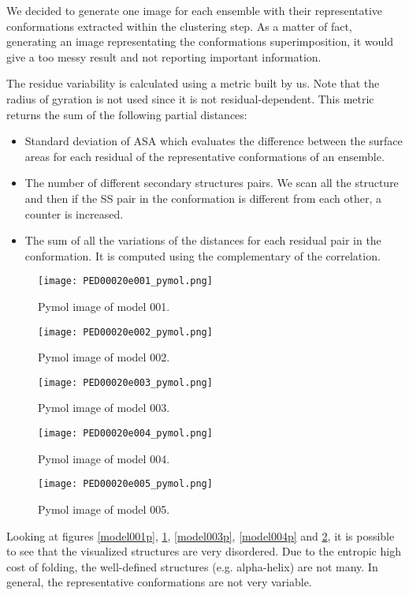 We decided to generate one image for each ensemble with their representative conformations extracted within the clustering step.
As a matter of fact, generating an image representating the conformations superimposition, it would give a too messy result and not reporting important information.

The residue variability is calculated using a metric built by us. Note that the radius of gyration is not used since it is not residual-dependent.
This metric returns the sum of the following partial distances:
\begin{itemize}
\item Standard deviation of ASA which evaluates the difference between the surface areas for each residual of the representative conformations of an ensemble.
\item The number of different secondary structures pairs. We scan all the structure and then if the SS pair in the conformation is different from each other, a counter is increased.
\item The sum of all the variations of the distances for each residual pair in the conformation. It is computed using the complementary of the correlation. 
\end{itemize}

\begin{figure}[H]
	\begin{minipage}[b]{0.97\textwidth}
		\centering
		\texttt{[image: PED00020e001\_pymol.png]}
		\caption{Pymol image of model 001.}
		\label{model001p}
	\end{minipage}
	\begin{minipage}[b]{0.97\textwidth}
		\centering
		\texttt{[image: PED00020e002\_pymol.png]}
		\caption{Pymol image of model 002.}
		\label{model002p}
	\end{minipage}
\end{figure}
\begin{figure}[H]
	\begin{minipage}[b]{0.99\textwidth}
		\centering
		\texttt{[image: PED00020e003\_pymol.png]}
		\caption{Pymol image of model 003.}
		\label{model003p}
	\end{minipage}
	\begin{minipage}[b]{0.99\textwidth}
		\centering
		\texttt{[image: PED00020e004\_pymol.png]}
		\caption{Pymol image of model 004.}
		\label{model004p}
	\end{minipage}
	\begin{minipage}[b]{0.99\textwidth}
		\centering
		\texttt{[image: PED00020e005\_pymol.png]}
		\caption{Pymol image of model 005.}
		\label{model005p}
	\end{minipage}
\end{figure}

\medskip
\medskip
\medskip

Looking at figures \ref{model001p}, \ref{model002p}, \ref{model003p}, \ref{model004p} and \ref{model005p}, it is possible to see that the visualized structures are very disordered. Due to the entropic high cost of folding, the well-defined structures (e.g. alpha-helix) are not many. In general, the representative conformations are not very variable.
